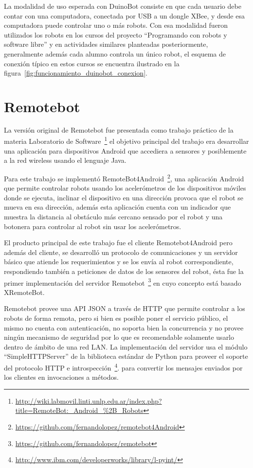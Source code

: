 La modalidad de uso esperada con DuinoBot consiste en que cada usuario
debe contar con una computadora, conectada por USB a un dongle XBee,
y desde esa computadora puede controlar uno o más robots. Con esa modalidad
fueron utilizados los robots en los cursos del proyecto
``Programando con robots y software libre'' y en actividades similares
planteadas posteriormente, generalmente además cada alumno controla
un único robot, el esquema de conexión típico en estos cursos se encuentra
ilustrado en la figura~\ref{fig:funcionamiento_duinobot_conexion}.

\section{Remotebot}\label{sec:remotebot}

La versión original de Remotebot fue presentada como trabajo práctico
de la materia Laboratorio de
Software~\footnote{\url{http://wiki.labmovil.linti.unlp.edu.ar/index.php?title=RemoteBot:_Android_\%2B_Robots}}
el objetivo principal del trabajo era desarrollar una aplicación para
dispositivos Android que accediera a sensores y posiblemente a la red
wireless usando el lenguaje Java.


Para este trabajo se implementó
RemoteBot4Android~\footnote{\url{https://github.com/fernandolopez/remotebot4Android}},
una aplicación Android
que permite controlar robots usando los acelerómetros de los dispositivos
móviles donde se ejecuta, inclinar el dispositivo en
una dirección provoca que el robot se mueva en esa dirección, además
esta aplicación cuenta con un indicador que muestra la distancia al obstáculo
más cercano sensado por el robot y una botonera para controlar al robot
sin usar los acelerómetros.

El producto principal de este trabajo fue el cliente
Remotebot4Android pero además del cliente, se desarrolló un 
protocolo de comunicaciones
y un servidor básico que atiende los requerimientos y se los envía al
robot correspondiente, respondiendo también a peticiones de datos de
los sensores del
robot, ésta fue la primer implementación del servidor
Remotebot~\footnote{\url{https://github.com/fernandolopez/remotebot}}
en cuyo concepto está basado XRemoteBot.

Remotebot provee una API JSON a través de HTTP que permite controlar a los
robots de forma remota, pero si bien es posible poner el servicio público,
el mismo no cuenta con autenticación, no soporta bien la concurrencia
y no provee ningún mecanismo de seguridad por lo que es recomendable solamente
usarlo dentro de ámbito de una red LAN.
La implementación del servidor
usa el módulo ``SimpleHTTPServer'' de la biblioteca estándar de Python para
proveer el soporte del protocolo HTTP e
introspección~\footnote{\url{http://www.ibm.com/developerworks/library/l-pyint/}}.
para convertir los
mensajes enviados por los clientes en invocaciones a métodos.

